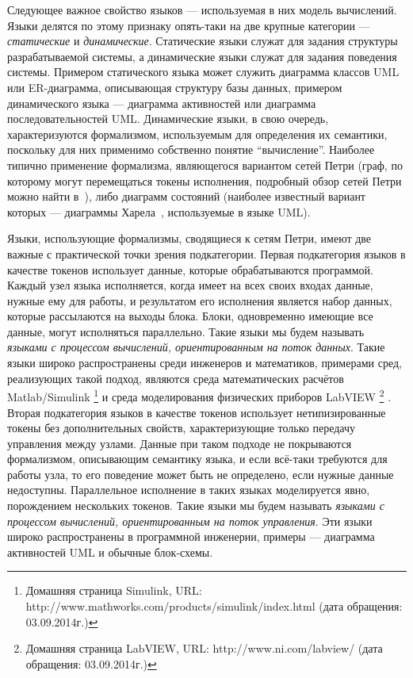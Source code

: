 Следующее важное свойство языков --- используемая в них модель вычислений. Языки 
делятся по этому признаку опять-таки на две крупные категории --- \textit{статические} 
и \textit{динамические}. Статические языки служат для задания структуры разрабатываемой 
системы, а динамические языки служат для задания поведения системы. Примером 
статического языка может служить диаграмма классов \ac{UML} или \ac{ER}-диаграмма, 
описывающая структуру базы данных, примером динамического языка --- диаграмма 
активностей или диаграмма последовательностей \ac{UML}. Динамические языки, в свою 
очередь, характеризуются формализмом, используемым для определения их семантики, 
поскольку для них применимо собственно понятие "`вычисление"'. Наиболее типично 
применение формализма, являющегося вариантом сетей Петри (граф, по которому 
могут перемещаться токены исполнения, подробный обзор сетей Петри можно найти в~\cite{murata1989petri}), 
либо диаграмм состояний (наиболее известный вариант которых --- диаграммы Харела~\cite{harel1987statecharts}, 
используемые в языке \ac{UML}). 

Языки, использующие формализмы, сводящиеся к сетям Петри, имеют две важные с 
практической точки зрения подкатегории. Первая подкатегория языков в качестве 
токенов использует данные, которые обрабатываются программой. Каждый узел языка 
исполняется, когда имеет на всех своих входах данные, нужные ему для работы, 
и результатом его исполнения является набор данных, которые рассылаются на 
выходы блока. Блоки, одновременно имеющие все данные, могут исполняться 
параллельно. Такие языки мы будем называть \textit{языками с процессом вычислений, 
ориентированным на поток данных}. Такие языки широко распространены среди 
инженеров и математиков, примерами сред, реализующих такой подход, являются 
среда математических расчётов Matlab/Simulink%
\footnote{Домашняя страница Simulink, URL: http://www.mathworks.com/products/simulink/index.html (дата обращения: 03.09.2014г.)}
 и среда моделирования физических приборов LabVIEW%
\footnote{Домашняя страница LabVIEW, URL: http://www.ni.com/labview/ (дата обращения: 03.09.2014г.)}%
. Вторая подкатегория языков в качестве токенов использует 
нетипизированные токены без дополнительных свойств, характеризующие только 
передачу управления между узлами. Данные при таком подходе не покрываются 
формализмом, описывающим семантику языка, и если всё-таки требуются для работы 
узла, то его поведение может быть не определено, если нужные данные недоступны. 
Параллельное исполнение в таких языках моделируется явно, порождением нескольких 
токенов. Такие языки мы будем называть \textit{языками с процессом вычислений, 
ориентированным на поток управления}. Эти языки широко распространены в 
программной инженерии, примеры --- диаграмма активностей \ac{UML} и обычные 
блок-схемы.

